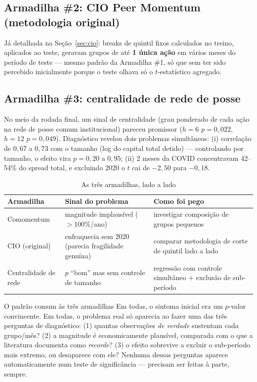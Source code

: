 \documentclass[11pt,a4paper]{article}
\begin{document}
\subsection{Armadilha \#2: CIO Peer Momentum (metodologia original)}

Já detalhada na Seção~\ref{sec:cio}: breaks de quintil fixos calculados no
treino, aplicados ao teste, geravam grupos de até \textbf{1 única ação} em
vários meses do período de teste --- mesmo padrão da Armadilha \#1, só que
sem ter sido percebido inicialmente porque o teste olhava só o
$t$-estatístico agregado.

\subsection{Armadilha \#3: centralidade de rede de posse}

No meio da rodada final, um sinal de centralidade (grau ponderado de cada
ação na rede de posse comum institucional) pareceu promissor ($h=6$
$p=0{,}022$, $h=12$ $p=0{,}049$). Diagnóstico revelou dois problemas
simultâneos: (i) correlação de $0{,}67$ a $0{,}73$ com o tamanho (log do
capital total detido) --- controlando por tamanho, o efeito vira
$p=0{,}20$ a $0{,}95$; (ii) 2 meses da COVID concentravam 42--54\% do
spread total, e excluindo 2020 o $t$ cai de $-2{,}50$ para $-0{,}18$.

\begin{table}[H]\centering\small
\caption{As três armadilhas, lado a lado}
\begin{tabular}{@{}p{3.3cm}p{4.5cm}p{4.5cm}@{}}
\toprule
Armadilha & Sinal do problema & Como foi pego \\
\midrule
Comomentum & magnitude implausível ($>$100\%/ano) & investigar composição de grupos pequenos \\
CIO (original) & enfraquecia sem 2020 (parecia fragilidade genuína) & comparar metodologia de corte de quintil lado a lado \\
Centralidade de rede & $p$ ``bom'' mas sem controle de tamanho & regressão com controle simultâneo + exclusão de sub-período \\
\bottomrule
\end{tabular}
\end{table}

\begin{licao}{O padrão comum às três armadilhas}
Em todas, o sintoma inicial era um $p$-valor convincente. Em todas, o
problema real só aparecia ao fazer uma das três perguntas de diagnóstico:
(1) quantas observações \emph{de verdade} sustentam cada grupo/mês? (2) a
magnitude é economicamente plausível, comparada com o que a literatura
documenta como \emph{recorde}? (3) o efeito sobrevive a excluir o
sub-período mais extremo, ou desaparece com ele? Nenhuma dessas perguntas
aparece automaticamente num teste de significância --- precisam ser feitas
à parte, sempre.
\end{licao}
\end{document}
